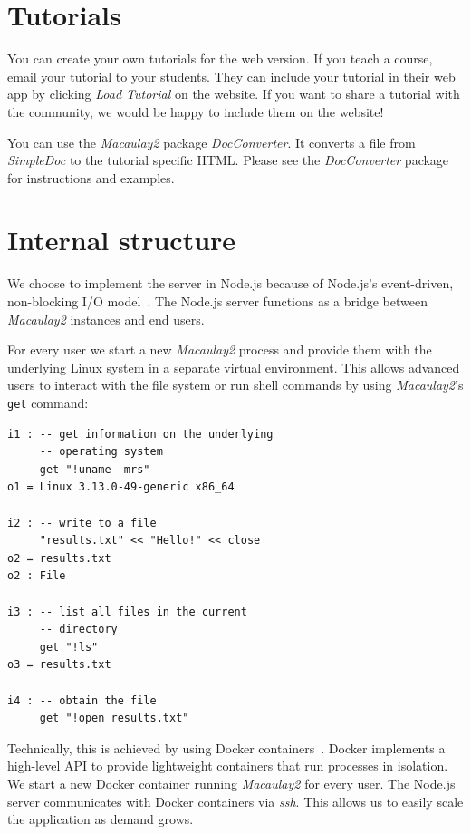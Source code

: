\documentclass[twocolumn]{article}
\def\M2{{\it Macaulay2}}
\begin{document}
\section{Tutorials}

You can create your own tutorials for the web version. If you teach a course,
email your tutorial to your students. They can include your tutorial in their web app by clicking
{\it Load Tutorial} on the website.
If you want to share a tutorial with the community, we would
be happy to include them on the website!

You can use the \M2 package {\it DocConverter}.
It converts a file from {\it SimpleDoc} to the tutorial specific HTML. Please see the
{\it DocConverter} package for instructions and examples.


\section{Internal structure}

We choose to implement the server in Node.js
because of Node.js's event-driven, non-blocking I/O model~\cite{nodejs}.
The Node.js server functions as a bridge between \M2 instances and end users.

For every user we start a new \M2 process and
provide them with the underlying Linux system in a separate virtual environment.
This allows advanced users to
interact with the file system or run shell commands by using \M2's {\tt get} 
command:

\begin{verbatim}
i1 : -- get information on the underlying
     -- operating system
     get "!uname -mrs" 
o1 = Linux 3.13.0-49-generic x86_64

i2 : -- write to a file     
     "results.txt" << "Hello!" << close
o2 = results.txt
o2 : File

i3 : -- list all files in the current
     -- directory
     get "!ls"
o3 = results.txt

i4 : -- obtain the file
     get "!open results.txt"
\end{verbatim}

Technically, this is achieved by using Docker containers~\cite{docker}. Docker implements
a high-level API to provide lightweight containers that run processes in isolation.
We start a new Docker container running \M2 for every user. The Node.js
server communicates with Docker containers via {\it ssh}. This allows us to easily
scale the application as demand grows.
\end{document}
